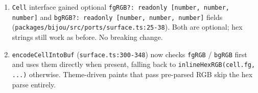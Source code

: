\begin{enumerate}
\def\labelenumi{\arabic{enumi}.}
\tightlist
\item
  \texttt{C\allowbreak{}e\allowbreak{}l\allowbreak{}l} interface gained optional \texttt{f\allowbreak{}g\allowbreak{}R\allowbreak{}G\allowbreak{}B\allowbreak{}?\allowbreak{}:\allowbreak{} \allowbreak{}r\allowbreak{}e\allowbreak{}a\allowbreak{}d\allowbreak{}o\allowbreak{}n\allowbreak{}l\allowbreak{}y\allowbreak{} \allowbreak{}[\allowbreak{}n\allowbreak{}u\allowbreak{}m\allowbreak{}b\allowbreak{}e\allowbreak{}r\allowbreak{},\allowbreak{} \allowbreak{}n\allowbreak{}u\allowbreak{}m\allowbreak{}b\allowbreak{}e\allowbreak{}r\allowbreak{},\allowbreak{} \allowbreak{}n\allowbreak{}u\allowbreak{}m\allowbreak{}b\allowbreak{}e\allowbreak{}r\allowbreak{}]} and \texttt{b\allowbreak{}g\allowbreak{}R\allowbreak{}G\allowbreak{}B\allowbreak{}?\allowbreak{}:\allowbreak{} \allowbreak{}r\allowbreak{}e\allowbreak{}a\allowbreak{}d\allowbreak{}o\allowbreak{}n\allowbreak{}l\allowbreak{}y\allowbreak{} \allowbreak{}[\allowbreak{}n\allowbreak{}u\allowbreak{}m\allowbreak{}b\allowbreak{}e\allowbreak{}r\allowbreak{},\allowbreak{} \allowbreak{}n\allowbreak{}u\allowbreak{}m\allowbreak{}b\allowbreak{}e\allowbreak{}r\allowbreak{},\allowbreak{} \allowbreak{}n\allowbreak{}u\allowbreak{}m\allowbreak{}b\allowbreak{}e\allowbreak{}r\allowbreak{}]} fields (\texttt{p\allowbreak{}a\allowbreak{}c\allowbreak{}k\allowbreak{}a\allowbreak{}g\allowbreak{}e\allowbreak{}s\allowbreak{}/\allowbreak{}b\allowbreak{}i\allowbreak{}j\allowbreak{}o\allowbreak{}u\allowbreak{}/\allowbreak{}s\allowbreak{}r\allowbreak{}c\allowbreak{}/\allowbreak{}p\allowbreak{}o\allowbreak{}r\allowbreak{}t\allowbreak{}s\allowbreak{}/\allowbreak{}s\allowbreak{}u\allowbreak{}r\allowbreak{}f\allowbreak{}a\allowbreak{}c\allowbreak{}e\allowbreak{}.\allowbreak{}t\allowbreak{}s\allowbreak{}:\allowbreak{}2\allowbreak{}5\allowbreak{}-\allowbreak{}3\allowbreak{}8}). Both are optional; hex strings still work as before. No breaking change.
\item
  \texttt{e\allowbreak{}n\allowbreak{}c\allowbreak{}o\allowbreak{}d\allowbreak{}e\allowbreak{}C\allowbreak{}e\allowbreak{}l\allowbreak{}l\allowbreak{}I\allowbreak{}n\allowbreak{}t\allowbreak{}o\allowbreak{}B\allowbreak{}u\allowbreak{}f} (\texttt{s\allowbreak{}u\allowbreak{}r\allowbreak{}f\allowbreak{}a\allowbreak{}c\allowbreak{}e\allowbreak{}.\allowbreak{}t\allowbreak{}s\allowbreak{}:\allowbreak{}3\allowbreak{}0\allowbreak{}0\allowbreak{}-\allowbreak{}3\allowbreak{}4\allowbreak{}8}) now checks \texttt{f\allowbreak{}g\allowbreak{}R\allowbreak{}G\allowbreak{}B} / \texttt{b\allowbreak{}g\allowbreak{}R\allowbreak{}G\allowbreak{}B} first and uses them directly when present, falling back to \texttt{i\allowbreak{}n\allowbreak{}l\allowbreak{}i\allowbreak{}n\allowbreak{}e\allowbreak{}H\allowbreak{}e\allowbreak{}x\allowbreak{}R\allowbreak{}G\allowbreak{}B\allowbreak{}(\allowbreak{}c\allowbreak{}e\allowbreak{}l\allowbreak{}l\allowbreak{}.\allowbreak{}f\allowbreak{}g\allowbreak{},\allowbreak{} \allowbreak{}.\allowbreak{}.\allowbreak{}.\allowbreak{})} otherwise. Theme-driven paints that pass pre-parsed RGB skip the hex parse entirely.

\end{enumerate}
